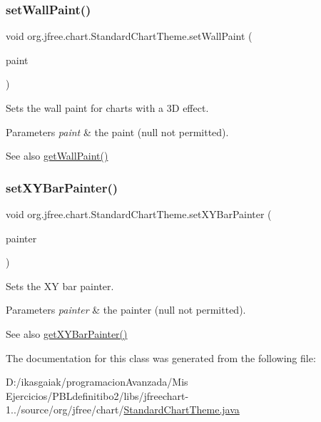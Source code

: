 \subsubsection{\texorpdfstring{set\+Wall\+Paint()}{setWallPaint()}}
{\footnotesize\ttfamily void org.\+jfree.\+chart.\+Standard\+Chart\+Theme.\+set\+Wall\+Paint (\begin{DoxyParamCaption}\item[{Paint}]{paint }\end{DoxyParamCaption})}

Sets the wall paint for charts with a 3D effect.


\begin{DoxyParams}{Parameters}
{\em paint} & the paint ({\ttfamily null} not permitted).\\
\hline
\end{DoxyParams}
\begin{DoxySeeAlso}{See also}
\mbox{\hyperlink{classorg_1_1jfree_1_1chart_1_1_standard_chart_theme_af3f47a3bc67bcc6e31299eb75e19bd2c}{get\+Wall\+Paint()}} 
\end{DoxySeeAlso}
\mbox{\label{classorg_1_1jfree_1_1chart_1_1_standard_chart_theme_ae553e9cbfe91c5d6bd54b4c03ca01a35}} 
\subsubsection{\texorpdfstring{set\+X\+Y\+Bar\+Painter()}{setXYBarPainter()}}
{\footnotesize\ttfamily void org.\+jfree.\+chart.\+Standard\+Chart\+Theme.\+set\+X\+Y\+Bar\+Painter (\begin{DoxyParamCaption}\item[{\mbox{\hyperlink{interfaceorg_1_1jfree_1_1chart_1_1renderer_1_1xy_1_1_x_y_bar_painter}{X\+Y\+Bar\+Painter}}}]{painter }\end{DoxyParamCaption})}

Sets the XY bar painter.


\begin{DoxyParams}{Parameters}
{\em painter} & the painter ({\ttfamily null} not permitted).\\
\hline
\end{DoxyParams}
\begin{DoxySeeAlso}{See also}
\mbox{\hyperlink{classorg_1_1jfree_1_1chart_1_1_standard_chart_theme_ab9ded4fbaa81ef9ca7b492015c0a8dc6}{get\+X\+Y\+Bar\+Painter()}} 
\end{DoxySeeAlso}


The documentation for this class was generated from the following file\+:\begin{DoxyCompactItemize}
\item 
D\+:/ikasgaiak/programacion\+Avanzada/\+Mis Ejercicios/\+P\+B\+Ldefinitibo2/libs/jfreechart-\/1../source/org/jfree/chart/\mbox{\hyperlink{_standard_chart_theme_8java}{Standard\+Chart\+Theme.\+java}}\end{DoxyCompactItemize}
